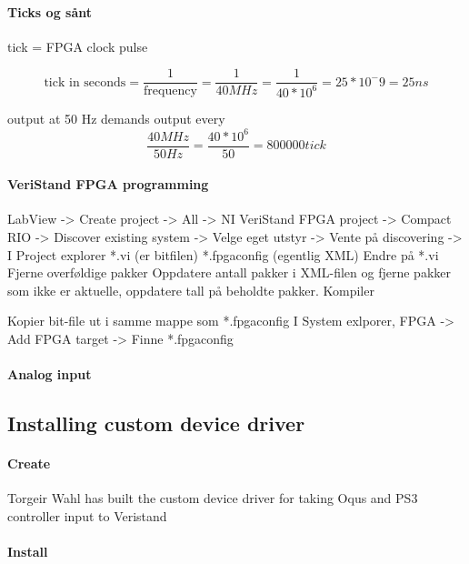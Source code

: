\documentclass[a4paper,twoside,english]{report}
\begin{document}
\paragraph{Ticks og sånt}

tick = FPGA clock pulse

\[
\text{tick in seconds}=\frac{1}{\text{frequency}}=\frac{1}{40MHz}=\frac{1}{40*10^{6}}=25*10^{-}9=25ns
\]

output at 50 Hz demands output every 
\[
\frac{40MHz}{50Hz}=\frac{40*10^{6}}{50}=800000tick
\]


\paragraph{VeriStand FPGA programming}

LabView -\textgreater{} Create project -\textgreater{} All -\textgreater{}
NI VeriStand FPGA project -\textgreater{} Compact RIO -\textgreater{}
Discover existing system -\textgreater{} Velge eget utstyr -\textgreater{}
Vente på discovering -\textgreater{} I Project explorer {*}.vi (er
bitfilen) {*}.fpgaconfig (egentlig XML) Endre på {*}.vi Fjerne overføldige
pakker Oppdatere antall pakker i XML-filen og fjerne pakker som ikke
er aktuelle, oppdatere tall på beholdte pakker. Kompiler

Kopier bit-file ut i samme mappe som {*}.fpgaconfig I System exlporer,
FPGA -\textgreater{} Add FPGA target -\textgreater{} Finne {*}.fpgaconfig

\paragraph{Analog input}


\clearpage{}

\subsection{Installing custom device driver}

\paragraph{Create}

Torgeir Wahl has built the custom device driver for taking Oqus and
PS3 controller input to Veristand

\paragraph{\label{subsec: Installing custom device driver}Install}
\end{document}
